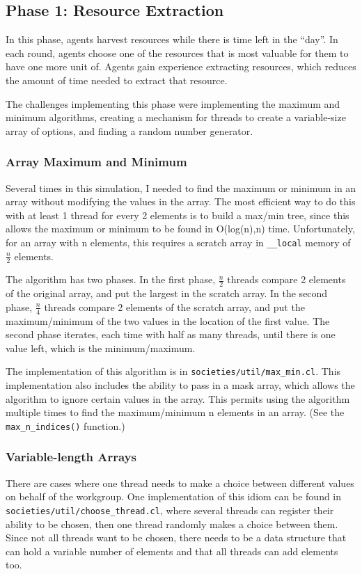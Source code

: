 \documentclass{article}
\begin{document}
\subsection{Phase 1: Resource Extraction}
In this phase, agents harvest resources while there is time left in the ``day''. In each round, agents choose one of the resources that is most valuable for them to have one more unit of. Agents gain experience extracting resources, which reduces the amount of time needed to extract that resource.

The challenges implementing this phase were implementing the maximum and minimum algorithms, creating a mechanism for threads to create a variable-size array of options, and finding a random number generator.

\subsubsection{Array Maximum and Minimum}
Several times in this simulation, I needed to find the maximum or minimum in an array without modifying the values in the array. The most efficient way to do this with at least 1 thread for every 2 elements is to build a max/min tree, since this allows the maximum or minimum to be found in O(log(n),n) time. Unfortunately, for an array with n elements, this requires a scratch array in \texttt{\_\_local} memory of $\frac{n}{2}$ elements.

The algorithm has two phases. In the first phase, $\frac{n}{2}$ threads compare 2 elements of the original array, and put the largest in the scratch array. In the second phase, $\frac{n}{4}$ threads compare 2 elements of the scratch array, and put the maximum/minimum of the two values in the location of the first value. The second phase iterates, each time with half as many threads, until there is one value left, which is the minimum/maximum.

The implementation of this algorithm is in \texttt{societies/util/max\_min.cl}. This implementation also includes the ability to pass in a mask array, which allows the algorithm to ignore certain values in the array. This permits using the algorithm multiple times to find the maximum/minimum n elements in an array. (See the \texttt{max\_n\_indices()} function.)

\subsubsection{Variable-length Arrays}
There are cases where one thread needs to make a choice between different values on behalf of the workgroup. One implementation of this idiom can be found in \texttt{societies/util/choose\_thread.cl}, where several threads can register their ability to be chosen, then one thread randomly makes a choice between them. Since not all threads want to be chosen, there needs to be a data structure that can hold a variable number of elements and that all threads can add elements too.
\end{document}
